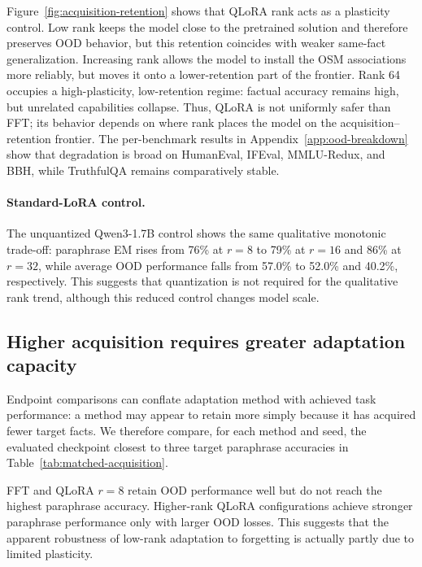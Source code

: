 \documentclass[11pt]{article}
\begin{document}
Figure~\ref{fig:acquisition-retention} shows that QLoRA rank acts as a
plasticity control. Low rank keeps the model close to the pretrained solution
and therefore preserves OOD behavior, but this retention coincides with weaker
same-fact generalization. Increasing rank allows the model to install the OSM
associations more reliably, but moves it onto a lower-retention part of the
frontier. Rank 64 occupies a high-plasticity, low-retention regime: factual
accuracy remains high, but unrelated capabilities collapse. Thus, QLoRA is not
uniformly safer than FFT; its behavior depends on where rank places the model
on the acquisition--retention frontier. The per-benchmark results in
Appendix~\ref{app:ood-breakdown} show that degradation is broad on HumanEval,
IFEval, MMLU-Redux, and BBH, while TruthfulQA remains comparatively stable.

\paragraph{Standard-LoRA control.}
The unquantized Qwen3-1.7B control shows the same qualitative monotonic trade-off:
paraphrase EM rises from 76\% at $r=8$ to 79\% at $r=16$ and 86\% at $r=32$,
while average OOD performance falls from 57.0\% to 52.0\% and 40.2\%,
respectively. This suggests that quantization is not required for the qualitative
rank trend, although this reduced control changes model scale.

\subsection{Higher acquisition requires greater adaptation capacity}
Endpoint comparisons can conflate adaptation method with achieved task
performance: a method may appear to retain more simply because it has
acquired fewer target facts. We therefore compare, for each method and seed, the
evaluated checkpoint closest to three target paraphrase accuracies in
Table~\ref{tab:matched-acquisition}.

FFT and QLoRA $r=8$ retain OOD performance well but do not reach the highest
paraphrase accuracy. Higher-rank QLoRA configurations achieve stronger
paraphrase performance only with larger OOD losses.
This suggests that the apparent robustness of low-rank adaptation to forgetting is actually partly due to limited
plasticity.

\end{document}
